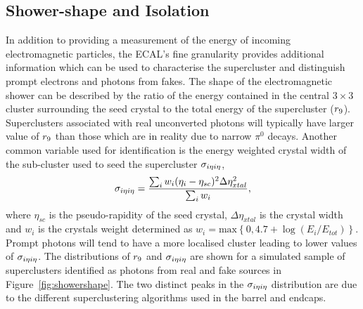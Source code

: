 \subsection{Shower-shape and Isolation}
In addition to providing a measurement of the energy of incoming electromagnetic particles,
the ECAL's fine granularity provides additional information which can be used to characterise
the supercluster and distinguish prompt electrons and photons from fakes.  
The shape of the electromagnetic shower can be described by the ratio of the energy contained
in the central $3\times3$ cluster surrounding the seed crystal to the total energy of the supercluster
($r_{9}$). Superclusters associated with real unconverted photons will typically have larger value of 
$r_{9}$ than those which are in reality due to narrow $\pi^{0}$ decays. Another common variable used
for identification is the energy weighted crystal width of the sub-cluster used to seed the supercluster  
$\sigma_{i\eta i\eta}$, 
\begin{equation}
\sigma_{i\eta i\eta} = \frac{\sum_{i}w_{i}(\eta_{i}-\eta_{sc})^{2}\Delta\eta^{2}_{xtal}}{\sum_{i}w_{i}},
\end{equation}
where $\eta_{sc}$ is the pseudo-rapidity of the seed crystal, $\Delta\eta_{xtal}$ is the crystal width
and $w_{i}$ is the crystals weight determined as $w_{i} = \mathrm{max}\left\{0,4.7+\log(E_{i}/E_{tot})\right\}$.
Prompt photons will tend to have a more localised cluster leading to lower values of $\sigma_{i\eta i\eta}$. 
The distributions of $r_{9}$ and $\sigma_{i\eta i\eta}$ are shown for a simulated sample of 
superclusters identified as photons from real and fake sources in Figure~\ref{fig:showershape}.
The two distinct peaks in the $\sigma_{i\eta i\eta}$ distribution are due to the different superclustering algorithms 
used in the barrel and endcaps.

